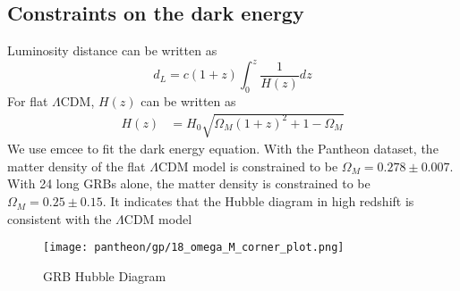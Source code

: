 \subsection{Constraints on the dark energy}
Luminosity distance can be written as
\begin{equation}
    d_L = c(1+z)  \int_{0}^{z} \frac{1}{H(z)} dz
\end{equation}
For flat $\Lambda$CDM, $H(z)$ can be written as
\begin{align}
    \label{eq4} H(z) &= H_0 \sqrt{\Omega_M (1+z)^2 + 1 - \Omega_M}
\end{align}
We use emcee\cite{emcee} to fit the dark energy equation. With the Pantheon dataset, the matter density of the flat $\Lambda$CDM model is constrained to be $\Omega_M=0.278 \pm 0.007$. With 24 long GRBs alone, the matter density is constrained to be $\Omega_M=0.25 \pm 0.15$. It indicates that the Hubble diagram in high redshift is consistent with the $\Lambda$CDM model
\begin{figure}[H]
	\centering
	\texttt{[image: pantheon/gp/18\_omega\_M\_corner\_plot.png]}
	\caption{GRB Hubble Diagram}
	\label{fig:OmegaM_GP}
\end{figure}

